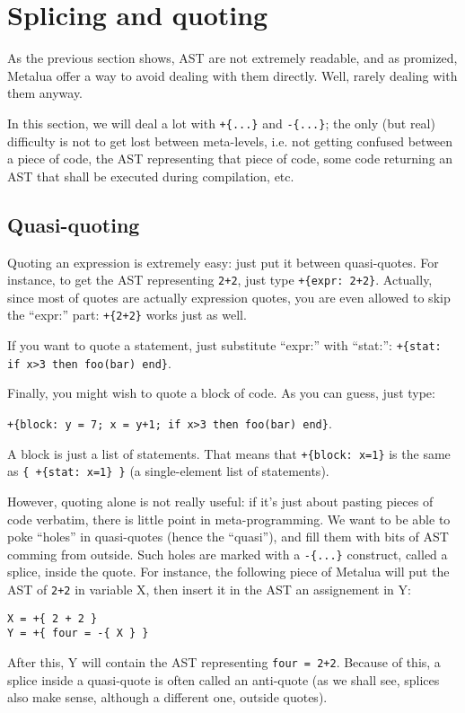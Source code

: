 \section{Splicing and quoting}
As the previous section shows, AST are not extremely readable, and as
promized, Metalua offer a way to avoid dealing with them
directly. Well, rarely dealing with them anyway.

In this section, we will deal a lot with \verb|+{...}| and
\verb|-{...}|; the only (but real) difficulty is not to get lost
between meta-levels, i.e. not getting confused between a piece of
code, the AST representing that piece of code, some code returning an
AST that shall be executed during compilation, etc.

\subsection{Quasi-quoting}
Quoting an expression is extremely easy: just put it between
quasi-quotes. For instance, to get the AST representing \verb|2+2|,
just type \verb|+{expr: 2+2}|. Actually, since most of quotes are
actually expression quotes, you are even allowed to skip the ``expr:''
part: \verb|+{2+2}| works just as well.

If you want to quote a statement, just substitute ``expr:'' with
``stat:'': {\tt+\{stat: if x>3 then foo(bar) end\}}.

Finally, you might wish to quote a block of code. As you can guess,
just type:

\verb|+{block: y = 7; x = y+1; if x>3 then foo(bar) end}|.

A block is just a list of statements. That means that 
\verb|+{block: x=1}| is the same as \verb|{ +{stat: x=1} }| (a
single-element list of statements).

However, quoting alone is not really useful: if it's just about
pasting pieces of code verbatim, there is little point in
meta-programming. We want to be able to poke ``holes'' in quasi-quotes
(hence the ``quasi''), and fill them with bits of AST comming from
outside. Such holes are marked with a \verb|-{...}| construct, called
a splice, inside the quote. For instance, the following piece of
Metalua will put the AST of \verb|2+2| in variable X, then insert it
in the AST an assignement in Y:

\begin{verbatim}
X = +{ 2 + 2 }
Y = +{ four = -{ X } }
\end{verbatim}

After this, Y will contain the AST representing \verb|four = 2+2|.
Because of this, a splice inside a quasi-quote is often called an
anti-quote (as we shall see, splices also make sense, although a
different one, outside quotes).

